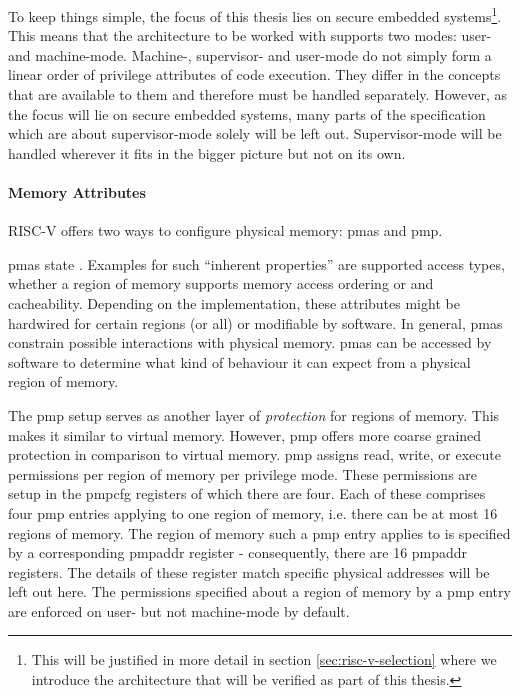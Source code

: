 To keep things simple, the focus of this thesis lies on secure embedded systems\footnote{%
    This will be justified in more detail in section \ref{sec:risc-v-selection} where we introduce the architecture that will be verified as part of this thesis.
}.
This means that the architecture to be worked with supports two modes: user- and machine-mode.
Machine-, supervisor- and user-mode do not simply form a linear order of privilege attributes of code execution.
They differ in the concepts that are available to them and therefore must be handled separately.
However, as the focus will lie on secure embedded systems, many parts of the specification which are about supervisor-mode solely will be left out.
Supervisor-mode will be handled wherever it fits in the bigger picture but not on its own.

\paragraph{Memory Attributes}
\label{sec:memory-attrs}

RISC-V offers two ways to configure physical memory: \glspl{pma} and \gls{pmp}.

\glspl{pma} state .
Examples for such \enquote{inherent properties} are supported access types, whether a region of memory supports memory access ordering or and cacheability.
Depending on the implementation, these attributes might be hardwired for certain regions (or all) or modifiable by software.
In general, \glspl{pma} constrain possible interactions with physical memory.
\glspl{pma} can be accessed by software to determine what kind of behaviour it can expect from a physical region of memory.

The \gls{pmp} setup serves as another layer of \textit{protection} for regions of memory.
This makes it similar to virtual memory.
However, \gls{pmp} offers more coarse grained protection in comparison to virtual memory.
\gls{pmp} assigns read, write, or execute permissions per region of memory per privilege mode.
These permissions are setup in the \gls{pmpcfg} registers of which there are four.
Each of these comprises four \gls{pmp} entries applying to one region of memory, i.e. there can be at most 16 regions of memory.
The region of memory such a \gls{pmp} entry applies to is specified by a corresponding \gls{pmpaddr} register - consequently, there are 16 \gls{pmpaddr} registers.
The details of these register match specific physical addresses will be left out here.
The permissions specified about a region of memory by a \gls{pmp} entry are enforced on user- but not machine-mode by default.

